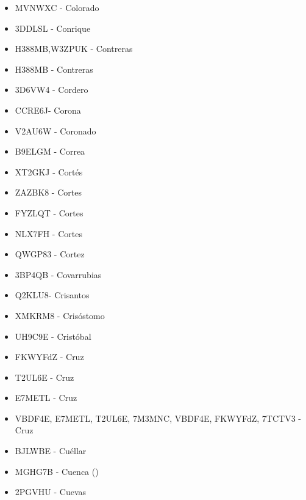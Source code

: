 \begin{itemize}[leftmargin=*,nosep]
\item MVNWXC - Colorado
\item 3DDLSL - Conrique
\item H388MB,W3ZPUK - Contreras
\item H388MB - Contreras
\item 3D6VW4  -  Cordero
\item CCRE6J-  Corona
\item V2AU6W - Coronado
\item B9ELGM - Correa
\item XT2GKJ  -  Cortés
\item ZAZBK8  -  Cortes
\item FYZLQT  -  Cortes
\item NLX7FH  -  Cortes
\item QWGP83 - Cortez
\item 3BP4QB - Covarrubias
\item Q2KLU8- Crisantos
\item XMKRM8 - Crisóstomo
\item UH9C9E - Cristóbal
\item FKWYFdZ - Cruz
\item T2UL6E  -  Cruz
\item E7METL  -  Cruz
\item VBDF4E, E7METL, T2UL6E, 7M3MNC, VBDF4E, FKWYFdZ, 7TCTV3 - Cruz
\item BJLWBE  -  Cuéllar
\item MGHG7B - Cuenca ()
\item 2PGVHU - Cuevas
\end{itemize}

